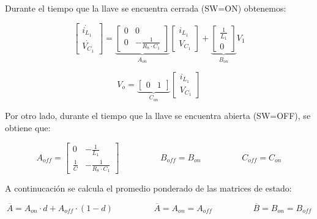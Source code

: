 \documentclass[e4_tp2_main.tex]{subfiles}
\begin{document}
Durante el tiempo que la llave se encuentra cerrada (SW=ON) obtenemos:

\begin{equation}
\begin{bmatrix}
\dot{i_{L_1}} \\
\dot{V_{C_1}} 
\end{bmatrix}
=
\underbrace{
\begin{bmatrix}
{0} & {0}\\
{0} & {-\frac{1}{R_8 \cdot C_1}} 
\end{bmatrix}
}_{A_{on}}
\begin{bmatrix}
{i_{L_1}} \\
{V_{C_1}} 
\end{bmatrix}
+
\underbrace{
\begin{bmatrix}
{\frac{1}{L_1}} \\
{0} 
\end{bmatrix}
}_{B_{on}}
V_1
\end{equation}


\begin{equation}
V_o =
\underbrace{
\begin{bmatrix}
{0} & {1} 
\end{bmatrix}
}_{C_{on}}
\begin{bmatrix}
{i_{L_1}} \\
{V_{C_1}} 
\end{bmatrix}
\end{equation}

Por otro lado, durante el tiempo que la llave se encuentra abierta (SW=OFF), se obtiene que: 

\begin{equation}
A_{off} = 
\begin{bmatrix}
{0} & {- \frac{1}{L_1}} \\ 
{\frac{1}{C}} & {-\frac{1}{R_8 \cdot C_1}}
\end{bmatrix}  
\hspace{2cm} B_{off}=B_{on}  
\hspace{2cm} C_{off} = C_{on}
\end{equation}


A continucaci\'on se calcula el promedio ponderado de las matrices de estado:

\begin{equation}
\overline{A} = A_{on} \cdot d + A_{off} \cdot (1-d) \hspace{2cm} \overline{A}=A_{on} = A_{off}  \hspace{2cm} \overline{B}=B_{on} = B_{off}  
\end{equation}
\end{document}
